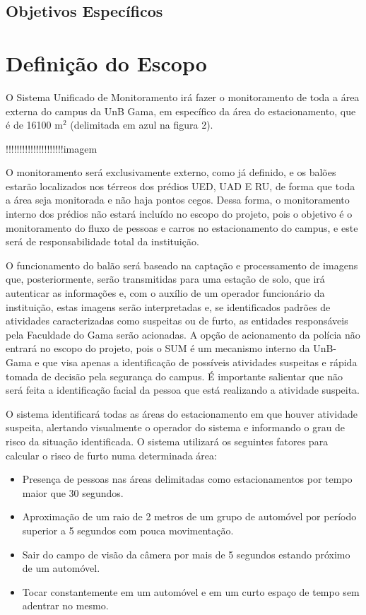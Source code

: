   \subsection{Objetivos Específicos} %
  \label{sub:objetivos_espec_ficos}


\section{Definição do Escopo} %
\label{sec:defini_o_do_escopo}


  O Sistema Unificado de Monitoramento irá fazer o monitoramento de toda a área externa do campus da UnB Gama, em específico da área do estacionamento, que é de 16100 m$^2$ (delimitada em azul na figura 2).

  !!!!!!!!!!!!!!!!!!!!!imagem

  O monitoramento será exclusivamente externo, como já definido, e os balões estarão localizados nos térreos dos prédios UED, UAD E RU, de forma que toda a área seja monitorada e não haja pontos cegos. Dessa forma, o monitoramento interno dos prédios não estará incluído no escopo do projeto, pois o objetivo é o monitoramento do fluxo de pessoas e carros no estacionamento do campus, e este será de responsabilidade total da instituição.

  O funcionamento do balão será baseado na captação e processamento de imagens que, posteriormente, serão transmitidas para uma estação de solo, que irá autenticar as informações e, com o auxílio de um operador funcionário da instituição, estas imagens serão interpretadas e, se identificados padrões de atividades caracterizadas como suspeitas ou de furto, as entidades responsáveis pela Faculdade do Gama serão acionadas. A opção de acionamento da polícia não entrará no escopo do projeto, pois o SUM é um mecanismo interno da UnB-Gama e que visa apenas a identificação de possíveis atividades suspeitas e rápida tomada de decisão pela segurança do campus. É importante salientar que não será feita a identificação facial da pessoa que está realizando a atividade suspeita.

  O sistema identificará todas as áreas do estacionamento em que houver atividade suspeita, alertando visualmente o operador do sistema e informando o grau de risco da situação identificada. O sistema utilizará os seguintes fatores para calcular o risco de furto numa determinada área:

  \begin{itemize}
    \item Presença de pessoas nas áreas delimitadas como estacionamentos por tempo maior que 30 segundos.
    \item Aproximação de um raio de 2 metros de um grupo de automóvel por período superior a 5 segundos com pouca movimentação.
    \item Sair do campo de visão da câmera por mais de 5 segundos estando próximo de um automóvel.
    \item Tocar constantemente em um automóvel e em um curto espaço de tempo sem adentrar no mesmo.
  \end{itemize}

